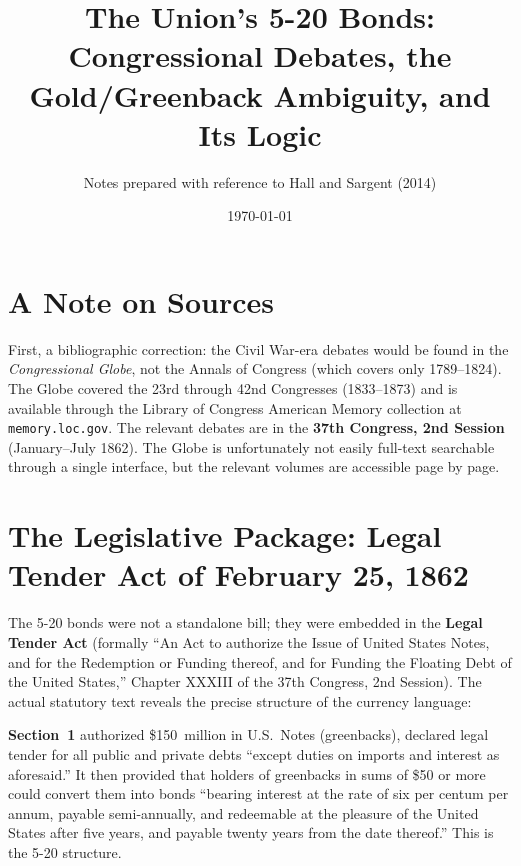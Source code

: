 \documentclass[12pt]{article}
\title{The Union's 5-20 Bonds: Congressional Debates, the Gold/Greenback
Ambiguity, and Its Logic}
\author{Notes prepared with reference to Hall and Sargent (2014)}
\date{\today}
\begin{document}
\maketitle
\thispagestyle{empty}

\newpage

\tableofcontents

\newpage

\section{A Note on Sources}

First, a bibliographic correction: the Civil War-era debates would be
found in the \textit{Congressional Globe}, not the Annals of Congress
(which covers only 1789--1824). The Globe covered the 23rd through 42nd
Congresses (1833--1873) and is available through the Library of Congress
American Memory collection at \texttt{memory.loc.gov}. The relevant
debates are in the \textbf{37th Congress, 2nd Session} (January--July
1862). The Globe is unfortunately not easily full-text searchable through
a single interface, but the relevant volumes are accessible page by page.

\section{The Legislative Package: Legal Tender Act of February 25, 1862}

The 5-20 bonds were not a standalone bill; they were embedded in the
\textbf{Legal Tender Act} (formally ``An Act to authorize the Issue of
United States Notes, and for the Redemption or Funding thereof, and for
Funding the Floating Debt of the United States,'' Chapter XXXIII of the
37th Congress, 2nd Session). The actual statutory text reveals the
precise structure of the currency language:

\textbf{Section~1} authorized \$150~million in U.S.\ Notes (greenbacks),
declared legal tender for all public and private debts ``except duties on
imports and interest as aforesaid.'' It then provided that holders of
greenbacks in sums of \$50 or more could convert them into bonds ``bearing
interest at the rate of six per centum per annum, payable semi-annually,
and redeemable at the pleasure of the United States after five years, and
payable twenty years from the date thereof.'' This is the 5-20 structure.
\end{document}
